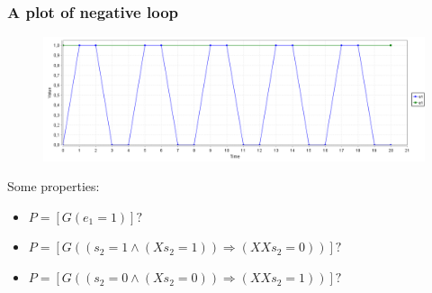\begin{frame}
  \frametitle{A plot of negative loop}

  \begin{figure}
    \includegraphics[width=\textwidth]{pic/neg_loop_simple_plot_1.png}
  \end{figure}

  Some properties:
  \begin{itemize}
    \item $P = [ G (e_1=1) ] ?$ 
    \item $P = [ G ((s_2=1 \land (X s_2=1)) \Rightarrow (X X s_2=0))] ?$ 
    \item $P = [ G ((s_2=0 \land (X s_2=0)) \Rightarrow (X X s_2=1))] ?$ 
  \end{itemize}

\end{frame}




